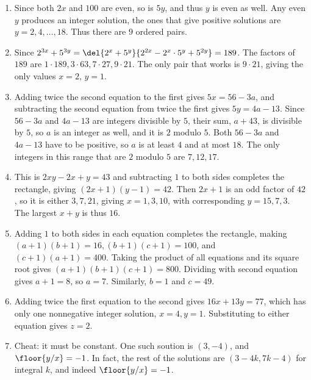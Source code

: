 \documentclass[10pt,paper=letter]{scrartcl}
\begin{document}
\begin{enumerate}

\item Since both $2x$ and $100$ are even, so is $5y$, and thus $y$ is even as well. Any even $y$ produces an integer solution, the ones that give positive solutions are $y = 2, 4, \ldots, 18$. Thus there are $9$ ordered pairs.

\item Since $2^{3x} + 5^{3y} = \del{2^x + 5^y}{2^{2x} - 2^x \cdot 5^y + 5^{2y}} = 189$. The factors of $189$ are $1 \cdot 189, 3 \cdot 63, 7 \cdot 27, 9 \cdot 21$. The only pair that works is $9 \cdot 21$, giving the only values $x = 2$, $y = 1$.

\item Adding twice the second equation to the first gives $5x = 56 - 3a$, and subtracting the second equation from twice the first gives $5y = 4a - 13$. Since $56 - 3a$ and $4a - 13$ are integers divisible by $5$, their sum, $a + 43$, is divisible by $5$, so $a$ is an integer as well, and it is $2$ modulo $5$. Both $56 - 3a$ and $4a - 13$ have to be positive, so $a$ is at least $4$ and at most $18$. The only integers in this range that are $2$ modulo $5$ are $7, 12, 17$.

\item This is $2xy - 2x + y = 43$ and subtracting $1$ to both sides completes the rectangle, giving $(2x + 1)(y - 1) = 42$. Then $2x + 1$ is an odd factor of $42$, so it is either $3, 7, 21$, giving $x = 1, 3, 10$, with corresponding $y = 15, 7, 3$. The largest $x + y$ is thus $16$.

\item Adding $1$ to both sides in each equation completes the rectangle, making $(a+1)(b+1) = 16, (b+1)(c+1) = 100$, and $(c+1)(a+1) = 400$. Taking the product of all equations and its square root gives $(a+1)(b+1)(c+1) = 800$. Dividing with second equation gives $a+1 = 8$, so $a = 7$. Similarly, $b = 1$ and $c = 49$.

\item Adding twice the first equation to the second gives $16x + 13y = 77$, which has only one nonnegative integer solution, $x = 4, y = 1$. Substituting to either equation gives $z = 2$.

\item Cheat: it must be constant. One such soution is $(3, -4)$, and $\floor{y/x} = -1$. In fact, the rest of the solutions are $(3-4k, 7k-4)$ for integral $k$, and indeed $\floor{y/x} = -1$.


\end{enumerate}
\end{document}
